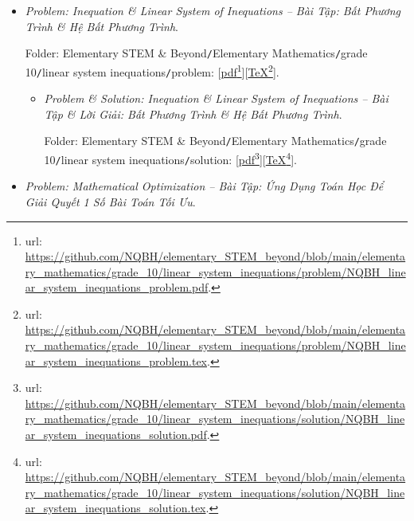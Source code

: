 \documentclass{article}
\begin{document}
\begin{itemize}
	\item {\it Problem: Inequation \& Linear System of Inequations -- Bài Tập: Bất Phương Trình \& Hệ Bất Phương Trình}.
	
	Folder: {\sf Elementary STEM \& Beyond{\tt/}Elementary Mathematics{\tt/}grade 10{\tt/}linear system inequations{\tt/}problem}: [\href{https://github.com/NQBH/elementary_STEM_beyond/blob/main/elementary_mathematics/grade_10/linear_system_inequations/problem/NQBH_linear_system_inequations_problem.pdf}{pdf}\footnote{{\sc url}: \url{https://github.com/NQBH/elementary_STEM_beyond/blob/main/elementary_mathematics/grade_10/linear_system_inequations/problem/NQBH_linear_system_inequations_problem.pdf}.}][\href{https://github.com/NQBH/elementary_STEM_beyond/blob/main/elementary_mathematics/grade_10/linear_system_inequations/problem/NQBH_linear_system_inequations_problem.tex}{\TeX}\footnote{{\sc url}: \url{https://github.com/NQBH/elementary_STEM_beyond/blob/main/elementary_mathematics/grade_10/linear_system_inequations/problem/NQBH_linear_system_inequations_problem.tex}.}].
	\begin{itemize}
		\item {\it Problem \& Solution: Inequation \& Linear System of Inequations -- Bài Tập \& Lời Giải: Bất Phương Trình \& Hệ Bất Phương Trình}.
		
		Folder: {\sf Elementary STEM \& Beyond{\tt/}Elementary Mathematics{\tt/}grade 10{\tt/}linear system inequations{\tt/}solution}: [\href{https://github.com/NQBH/elementary_STEM_beyond/blob/main/elementary_mathematics/grade_10/linear_system_inequations/solution/NQBH_linear_system_inequations_solution.pdf}{pdf}\footnote{{\sc url}: \url{https://github.com/NQBH/elementary_STEM_beyond/blob/main/elementary_mathematics/grade_10/linear_system_inequations/solution/NQBH_linear_system_inequations_solution.pdf}.}][\href{https://github.com/NQBH/elementary_STEM_beyond/blob/main/elementary_mathematics/grade_10/linear_system_inequations/solution/NQBH_linear_system_inequations_solution.tex}{\TeX}\footnote{{\sc url}: \url{https://github.com/NQBH/elementary_STEM_beyond/blob/main/elementary_mathematics/grade_10/linear_system_inequations/solution/NQBH_linear_system_inequations_solution.tex}.}].
	\end{itemize}
	\item {\it Problem: Mathematical Optimization -- Bài Tập: Ứng Dụng Toán Học Để Giải Quyết 1 Số Bài Toán Tối Ưu}.
	

\end{itemize}
\end{document}
